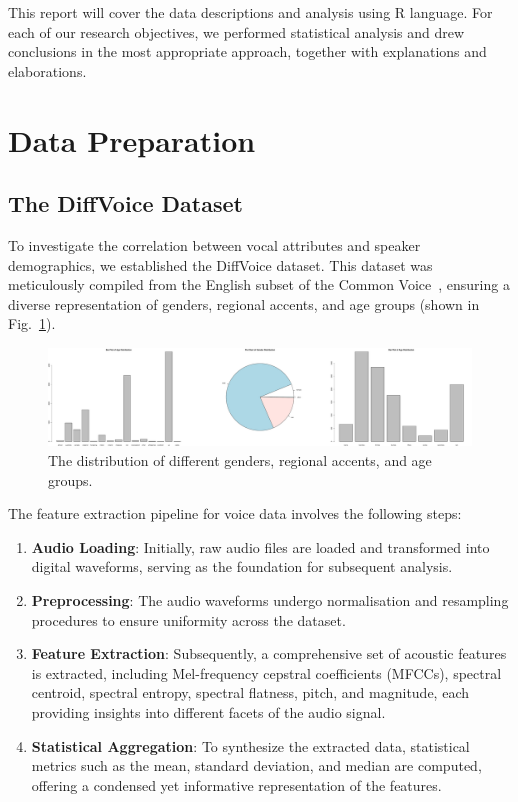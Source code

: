 \documentclass{article}
\begin{document}
	This report will cover the data descriptions and analysis using R language. For each of our research objectives, we performed statistical analysis and drew conclusions in the most appropriate approach, together with explanations and elaborations.
	
	
	\section{Data Preparation}
	
	\subsection{The DiffVoice Dataset}
	
	To investigate the correlation between vocal attributes and speaker demographics, we established the DiffVoice dataset. This dataset was meticulously compiled from the English subset of the Common Voice~\cite{ardila2019common}, ensuring a diverse representation of genders, regional accents, and age groups (shown in Fig.~\ref{distribution}).
	
	\begin{figure}
		\centering
		\includegraphics[width=\textwidth]{graphs/distribution.pdf}
		\caption{The distribution of different genders, regional accents, and age groups.}
		\label{distribution}
	\end{figure}
	
	The feature extraction pipeline for voice data involves the following steps:
	\begin{enumerate}
		\item \textbf{Audio Loading}: Initially, raw audio files are loaded and transformed into digital waveforms, serving as the foundation for subsequent analysis.
		\item \textbf{Preprocessing}: The audio waveforms undergo normalisation and resampling procedures to ensure uniformity across the dataset.
		\item \textbf{Feature Extraction}: Subsequently, a comprehensive set of acoustic features is extracted, including Mel-frequency cepstral coefficients (MFCCs), spectral centroid, spectral entropy, spectral flatness, pitch, and magnitude, each providing insights into different facets of the audio signal.
		\item \textbf{Statistical Aggregation}: To synthesize the extracted data, statistical metrics such as the mean, standard deviation, and median are computed, offering a condensed yet informative representation of the features.
	\end{enumerate}
	
\end{document}
